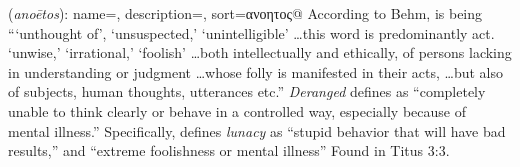 \item[Lunacy,]

(\textit{anoētos}):
{
    name=,
    description={},
    sort=ανοητος@
}
According to Behm, is being ```unthought of', `unsuspected,' `unintelligible' \ldots this word is predominantly act. `unwise,' `irrational,' `foolish' \ldots both intellectually and ethically, of persons lacking in understanding or judgment \ldots whose folly is manifested in their acts, \ldots but also of subjects, human thoughts, utterances etc.'' 
\emph{Deranged} defines as ``completely unable to think clearly or behave in a controlled way, especially because of mental illness.'' Specifically, defines \emph{lunacy} as ``stupid behavior that will have bad results,'' and ``extreme foolishness or mental illness''
Found in Titus 3:3.
